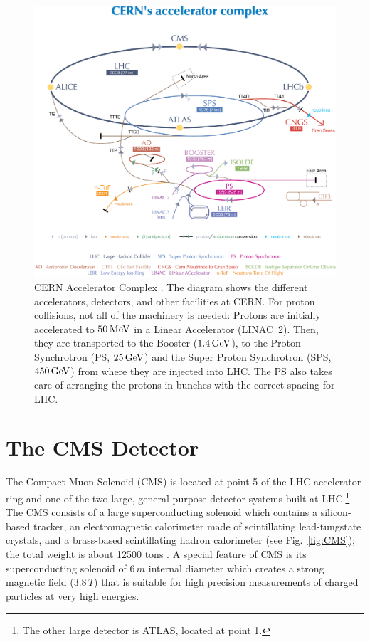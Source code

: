 \begin{figure}
	\includegraphics[width=.8\textwidth]{Detector/0812015}
	\centering
	\caption{CERN Accelerator Complex \cite{Christiane:1260465}. The diagram shows the different accelerators, detectors, and other facilities at CERN. For proton collisions, not all of the machinery is needed: Protons are initially accelerated to $50\,\text{Me\hspace{-.08em}V}$ in a Linear Accelerator (LINAC~2). Then, they are transported to the Booster ($1.4\,\text{Ge\hspace{-.08em}V}$), to the Proton Synchrotron (PS, $25\,\text{Ge\hspace{-.08em}V}$) and the Super Proton Synchrotron (SPS, $450\,\text{Ge\hspace{-.08em}V}$) from where they are injected into LHC. The PS also takes care of arranging the protons in bunches with the correct spacing for LHC.}
	\label{fig:LHC}
\end{figure}

\section{The CMS Detector}
The Compact Muon Solenoid (CMS) is located at point 5 of the LHC accelerator ring and one of the two large, general purpose detector systems built at LHC.\footnote{The other large detector is ATLAS, located at point 1.} The CMS consists of a large superconducting solenoid which contains a silicon-based tracker, an electromagnetic calorimeter made of scintillating lead-tungstate crystals, and a brass-based scintillating hadron calorimeter (see Fig.~\ref{fig:CMS}); the total weight is about 12500 tons \cite{Chatrchyan:2008aa}. A special feature of CMS is its superconducting solenoid of $6\,\unit{m}$ internal diameter which creates a strong magnetic field ($3.8\,\unit{T}$) that is suitable for high precision measurements of charged particles at very high energies.

